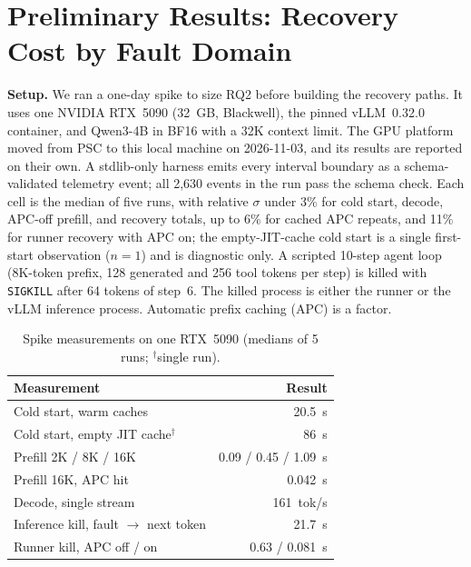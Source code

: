 
\section{Preliminary Results: Recovery Cost by Fault Domain}
\label{sec:spike}

\textbf{Setup.} We ran a one-day spike to size RQ2 before building the recovery paths. It uses one NVIDIA RTX~5090 (32~GB, Blackwell), the pinned vLLM~0.32.0 container, and Qwen3-4B in BF16 with a 32K context limit. The GPU platform moved from PSC to this local machine on 2026-11-03, and its results are reported on their own. A stdlib-only harness emits every interval boundary as a schema-validated telemetry event; all 2{,}630 events in the run pass the schema check. Each cell is the median of five runs, with relative $\sigma$ under 3\% for cold start, decode, APC-off prefill, and recovery totals, up to 6\% for cached APC repeats, and 11\% for runner recovery with APC on; the empty-JIT-cache cold start is a single first-start observation ($n{=}1$) and is diagnostic only. A scripted 10-step agent loop (8K-token prefix, 128 generated and 256 tool tokens per step) is killed with \texttt{SIGKILL} after 64 tokens of step~6. The killed process is either the runner or the vLLM inference process. Automatic prefix caching (APC) is a factor.

\begin{table}[ht]
\caption{Spike measurements on one RTX~5090 (medians of 5 runs; $^\dagger$single run).}
\label{tab:spike}
\vskip 0.10in
\centering
\small
\begin{tabular}{@{}lr@{}}
\toprule
Measurement & Result \\
\midrule
Cold start, warm caches & 20.5~s \\
Cold start, empty JIT cache$^\dagger$ & 86~s \\
Prefill 2K / 8K / 16K & 0.09 / 0.45 / 1.09~s \\
Prefill 16K, APC hit & 0.042~s \\
Decode, single stream & 161~tok/s \\
\midrule
Inference kill, fault $\to$ next token & 21.7~s \\
Runner kill, APC off / on & 0.63 / 0.081~s \\
\bottomrule
\end{tabular}
\vskip -0.05in
\end{table}

